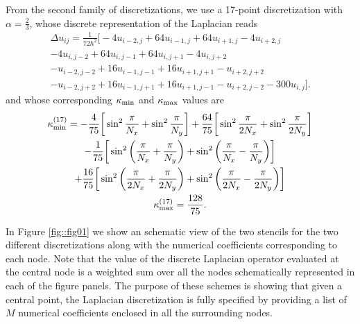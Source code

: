 \documentclass[preprint,12pt]{elsarticle}
\newcommand{\kmin}{\kappa_{\rm min}}
\newcommand{\kmax}{\kappa_{\rm max}}
\begin{document}
From the second family of discretizations, we use  a
17-point discretization with $\alpha = \frac{2}{3}$, whose
 discrete representation of the Laplacian
 reads
%
\begin{gather}
\Delta u_{ij}  = \frac{1}{72 h^2} \bigg [
- 4 u_{i-2,j} + 64 u_{i-1,j} + 64 u_{i+1,j} - 4 u_{i+2,j} \nonumber\\
- 4 u_{i,j-2} + 64 u_{i,j-1} + 64 u_{i,j+1} - 4 u_{i,j+2}  \nonumber\\
- u_{i-2,j-2} + 16 u_{i-1,j-1} + 16  u_{i+1,j+1} - u_{i+2,j+2} \nonumber\\ 
- u_{i-2,j+2} + 16 u_{i-1,j+1} + 16  u_{i+1,j-1} - u_{i+2,j-2} - 300 u_{i,j} \bigg ].
\label{eq:17-points}
\end{gather}  
%
and whose  corresponding $\kmin$ and $\kmax$ values are
%
\begin{gather}
\kmin^{(17)} =
-\frac{4}{75} \bigg [ \sin^2 \frac{\pi }{N_x} + \sin^2 \frac{\pi }{N_y} \bigg ] + \frac{64}{75} \bigg [ \sin^2 \frac{\pi}{2
  N_x}  + \sin^2 \frac{\pi}{2 N_y} \bigg ] \nonumber\\
- \frac{1}{75} \bigg [ \sin^2 { \bigg ( \frac{\pi}{N_x} + \frac{\pi}{N_y} \bigg ) + \sin^2 { \bigg ( \frac{\pi}{N_x} - \frac{\pi}{N_y} \bigg ) }} \bigg ] \\
+ \frac{16}{75} \bigg [ \sin^2 { \bigg ( \frac{\pi}{2N_x} + \frac{\pi}{2N_y} \bigg ) + \sin^2 { \bigg ( \frac{\pi}{2N_x} - \frac{\pi}{2N_y} \bigg ) }} \bigg ] \\
\kmax^{(17)} = \frac{128}{75}.
\end{gather}  

In Figure \ref{fig::fig01} we show an schematic view of the two
stencils for the two different discretizations along with the
numerical coefficients corresponding to each node.  Note that the
value of the discrete Laplacian operator evaluated at the central node
is a weighted sum over all the nodes schematically represented in each
of the figure panels. The purpose of these schemes is showing that
given a central point, the Laplacian discretization is fully specified
by providing a list of $M$ numerical coefficients enclosed in all
the surrounding nodes.
\end{document}
